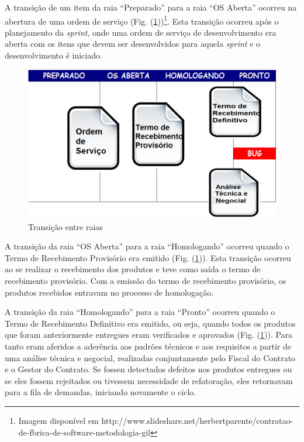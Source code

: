 A transição de um item da raia “Preparado” para a raia “OS Aberta” ocorreu na abertura de uma ordem de serviço (Fig. (\ref{kanban3}))\footnote{Imagem disponível em http://www.slideshare.net/herbertparente/contratao-de-fbrica-de-software-metodologia-gil}. Esta transição ocorreu após o planejamento da \textit{sprint}, onde uma ordem de serviço de desenvolvimento era aberta com os itens que devem ser desenvolvidos para aquela \textit{sprint} e o desenvolvimento é iniciado. 

\begin{figure}[H]
		\centering
		
			\includegraphics[scale=0.5]{figuras/kanbanIPHAN3.png}
		\caption{Transição entre raias}
		\label{kanban3}
\end{figure}

A transição da raia “OS Aberta” para a raia “Homologando” ocorreu quando o Termo de Recebimento Provisório era emitido (Fig. (\ref{kanban3})). Esta transição ocorreu ao se realizar o recebimento dos produtos e teve como saída o termo de recebimento provisório. Com a emissão do termo de recebimento provisório, os produtos recebidos entravam no processo de homologação. 

A transição da raia “Homologando” para a raia “Pronto” ocorreu quando o Termo de Recebimento Definitivo era emitido, ou seja, quando todos os produtos que foram anteriormente entregues eram verificados e aprovados (Fig. (\ref{kanban3})). Para tanto eram aferidos a aderência aos padrões técnicos e aos requisitos a partir de uma análise técnica e negocial, realizadas conjuntamente pelo Fiscal do Contrato e o Gestor do Contrato. Se fossen detectados defeitos nos produtos entregues ou se eles fossem rejeitados ou tivessem necessidade de refatoração, eles retornavam para a fila de demandas, iniciando novamente o ciclo. 

